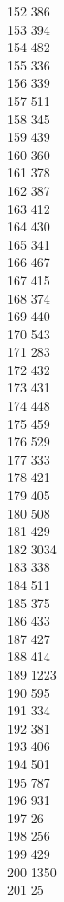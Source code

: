 { 152	386 \\
 153	394 \\
 154	482 \\
 155	336 \\
 156	339 \\
 157	511 \\
 158	345 \\
 159	439 \\
 160	360 \\
 161	378 \\
 162	387 \\
 163	412 \\
 164	430 \\
 165	341 \\
 166	467 \\
 167	415 \\
 168	374 \\
 169	440 \\
 170	543 \\
 171	283 \\
 172	432 \\
 173	431 \\
 174	448 \\
 175	459 \\
 176	529 \\
 177	333 \\
 178	421 \\
 179	405 \\
 180	508 \\
 181	429 \\
 182	3034 \\
 183	338 \\
 184	511 \\
 185	375 \\
 186	433 \\
 187	427 \\
 188	414 \\
 189	1223 \\
 190	595 \\
 191	334 \\
 192	381 \\
 193	406 \\
 194	501 \\
 195	787 \\
 196	931 \\
 197	26 \\
 198	256 \\
 199	429 \\
 200	1350 \\
 201	25 \\
}
